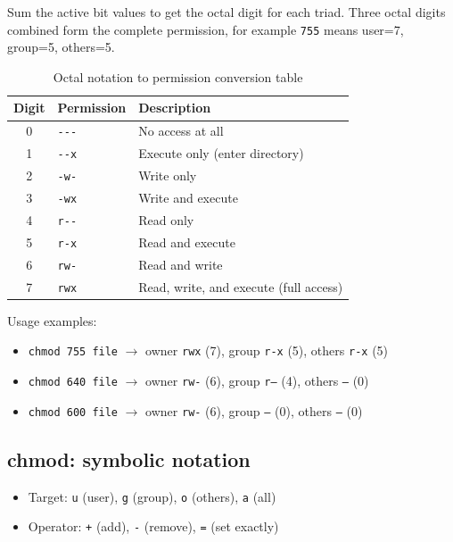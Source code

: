 Sum the active bit values to get the octal digit for each triad. Three octal
digits combined form the complete permission, for example \texttt{755} means
user=7, group=5, others=5.

\begin{table}[htbp]
    \centering
    \caption{Octal notation to permission conversion table}
    \begin{tabular}{cll}
        \hline
        \textbf{Digit} & \textbf{Permission} & \textbf{Description} \\
        \hline
        0 & \texttt{-{}-{}-} & No access at all \\
        1 & \texttt{-{}-x} & Execute only (enter directory) \\
        2 & \texttt{-w-} & Write only \\
        3 & \texttt{-wx} & Write and execute \\
        4 & \texttt{r-{}-} & Read only \\
        5 & \texttt{r-x} & Read and execute \\
        6 & \texttt{rw-} & Read and write \\
        7 & \texttt{rwx} & Read, write, and execute (full access) \\
        \hline
    \end{tabular}
\end{table}

Usage examples:
\begin{itemize}
    \item \texttt{chmod 755 file} $\rightarrow$ owner \texttt{rwx} (7), group \texttt{r-x} (5), others \texttt{r-x} (5)
    \item \texttt{chmod 640 file} $\rightarrow$ owner \texttt{rw-} (6), group \texttt{r--} (4), others \texttt{---} (0)
    \item \texttt{chmod 600 file} $\rightarrow$ owner \texttt{rw-} (6), group \texttt{---} (0), others \texttt{---} (0)
\end{itemize}

\subsection*{chmod: symbolic notation}
\begin{itemize}
    \item Target: \texttt{u} (user), \texttt{g} (group), \texttt{o} (others), \texttt{a} (all)
    \item Operator: \texttt{+} (add), \texttt{-} (remove), \texttt{=} (set exactly)
\end{itemize}

